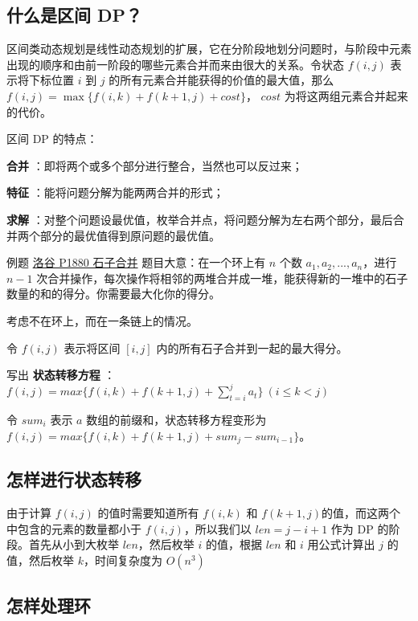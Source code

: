 
\subsection{什么是区间 DP？}

区间类动态规划是线性动态规划的扩展，它在分阶段地划分问题时，与阶段中元素出现的顺序和由前一阶段的哪些元素合并而来由很大的关系。令状态 $f(i,j)$ 表示将下标位置 $i$ 到 $j$ 的所有元素合并能获得的价值的最大值，那么 $f(i,j)=\max\{f(i,k)+f(k+1,j)+cost\}$， $cost$ 为将这两组元素合并起来的代价。

区间 DP 的特点：

\textbf{ 合并 } ：即将两个或多个部分进行整合，当然也可以反过来；

\textbf{ 特征 } ：能将问题分解为能两两合并的形式；

\textbf{ 求解 } ：对整个问题设最优值，枚举合并点，将问题分解为左右两个部分，最后合并两个部分的最优值得到原问题的最优值。

\begin{NOTE}{例题 \href{https://www.luogu.org/problemnew/show/P1880}{洛谷 P1880 石子合并}}{}
题目大意：在一个环上有 $n$ 个数 $a_1,a_2,...,a_n$，进行 $n-1$ 次合并操作，每次操作将相邻的两堆合并成一堆，能获得新的一堆中的石子数量的和的得分。你需要最大化你的得分。

\end{NOTE}


考虑不在环上，而在一条链上的情况。

令 $f(i,j)$ 表示将区间 $[i,j]$ 内的所有石子合并到一起的最大得分。

写出 \textbf{ 状态转移方程 } ： $f(i,j)=max\{f(i,k)+f(k+1,j)+\sum_{t=i}^{j} a_t \}~(i\le k<j)$

令 $sum_i$ 表示 $a$ 数组的前缀和，状态转移方程变形为 $f(i,j)=max\{f(i,k)+f(k+1,j)+sum_j-sum_{i-1} \}$。

\subsection{怎样进行状态转移}

由于计算 $f(i,j)$ 的值时需要知道所有 $f(i,k)$ 和 $f(k+1,j)$的值，而这两个中包含的元素的数量都小于 $f(i,j)$，所以我们以 $len=j-i+1$ 作为 DP 的阶段。首先从小到大枚举 $len$，然后枚举 $i$ 的值，根据 $len$ 和 $i$ 用公式计算出 $j$ 的值，然后枚举 $k$，时间复杂度为 $O(n^3)$

\subsection{怎样处理环}

